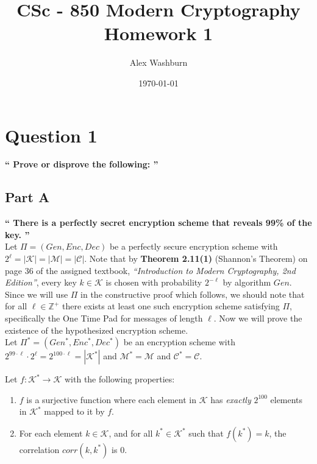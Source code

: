 \documentclass{article}
\title{CSc - 850 Modern Cryptography\\ Homework 1}
\author{Alex Washburn}
\date\today
\newcommand{\HomeworkText}[1]{\textbf{``#1''}\\}
\begin{document}

	\maketitle
	\vspace*{4cm}

	\restoregeometry
	
	\clearpage
	\section*{Question 1}
	\HomeworkText{
		Prove or disprove the following:
	}

	\subsection*{Part A}
	\HomeworkText{
		There is a perfectly secret encryption scheme that reveals 99\% of the key.
	}

    Let $\Pi = (Gen,Enc,Dec)$ be a perfectly secure encryption scheme with $2^\ell = |\mathcal{K}| = |\mathcal{M}| = |\mathcal{C}|$.
    Note that by \textbf{Theorem 2.11(1)} (Shannon's Theorem) on page 36 of the assigned textbook, \emph{``Introduction to Modern Cryptography, 2nd Edition''}, every key $k \in \mathcal{K}$ is chosen with probability $2^{-\ell}$ by algorithm $Gen$.
    Since we will use $\Pi$ in the constructive proof which follows, we should note that for all $\ell \in \mathbb{Z}^{+}$ there exists at least one such encryption scheme satisfying $\Pi$, specifically the One Time Pad for messages of length $\ell$.
    Now we will prove the existence of the hypothesized encryption scheme.\\
    
    Let $\Pi^{*} = (Gen^{*},Enc^{*},Dec^{*})$ be an encryption scheme with $2^{99\cdot\ell}\cdot2^\ell = 2^{100\cdot\ell} = |\mathcal{K}^{*}|$ and $\mathcal{M}^{*} = \mathcal{M}$ and $\mathcal{C}^{*} = \mathcal{C}$.
        
    Let $f : \mathcal{K}^{*} \to \mathcal{K}$ with the following properties:
    \begin{enumerate}

    	\item $f$ is a surjective function where each element in $\mathcal{K}$ has \emph{exactly} $2^{100}$ elements in $\mathcal{K}^{*}$ mapped to it by $f$.

    	\item For each element $k \in \mathcal{K}$, and for all $k^{*} \in \mathcal{K}^{*}$ such that $f(k^{*}) = k$, the correlation $corr(k,k^*)$ is $0$.
    	 
    \end{enumerate}
    
\end{document}
